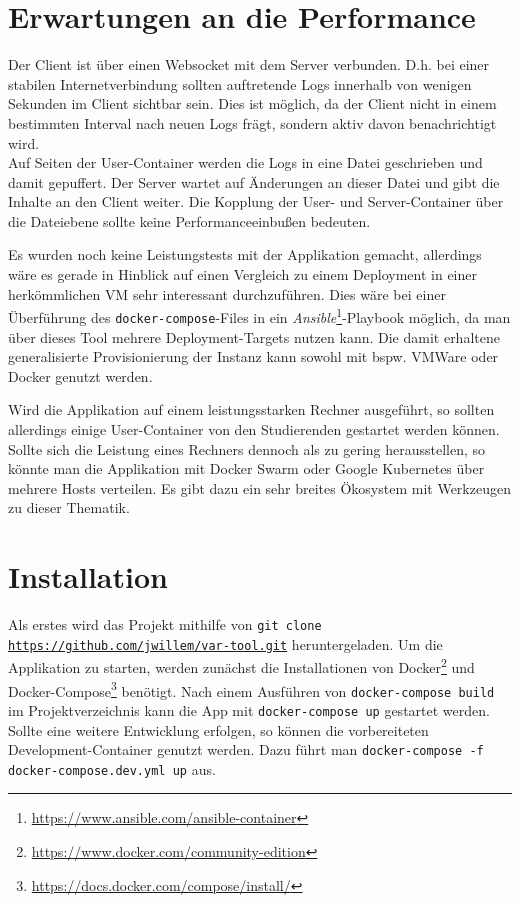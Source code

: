 \section{Erwartungen an die Performance}
Der Client ist über einen Websocket mit dem Server verbunden.
D.h. bei einer stabilen Internetverbindung sollten auftretende Logs innerhalb von wenigen Sekunden im Client sichtbar sein.
Dies ist möglich, da der Client nicht in einem bestimmten Interval nach neuen Logs frägt, sondern aktiv davon benachrichtigt wird.
\\
Auf Seiten der User-Container werden die Logs in eine Datei geschrieben und damit gepuffert.
Der Server wartet auf Änderungen an dieser Datei und gibt die Inhalte an den Client weiter.
Die Kopplung der User- und Server-Container über die Dateiebene sollte keine Performanceeinbußen bedeuten.
\par
Es wurden noch keine Leistungstests mit der Applikation gemacht, allerdings wäre es gerade in Hinblick auf einen Vergleich zu einem Deployment in einer herkömmlichen \ac{VM} sehr interessant durchzuführen.
Dies wäre bei einer Überführung des \texttt{docker-compose}-Files in ein \textit{Ansible}\footnote{\url{https://www.ansible.com/ansible-container}}-Playbook möglich, da man über dieses Tool mehrere Deployment-Targets nutzen kann.
Die damit erhaltene generalisierte Provisionierung der Instanz kann sowohl mit bspw. VMWare oder Docker genutzt werden.
\par
Wird die Applikation auf einem leistungsstarken Rechner ausgeführt, so sollten allerdings einige User-Container von den Studierenden gestartet werden können.
Sollte sich die Leistung eines Rechners dennoch als zu gering herausstellen, so könnte man die Applikation mit Docker Swarm oder Google Kubernetes über mehrere Hosts verteilen.
Es gibt dazu ein sehr breites Ökosystem mit Werkzeugen zu dieser Thematik.
\section{Installation}
Als erstes wird das Projekt mithilfe von \texttt{git clone \url{https://github.com/jwillem/var-tool.git}} heruntergeladen.
Um die Applikation zu starten, werden zunächst die Installationen von Docker\footnote{\url{https://www.docker.com/community-edition}} und Docker-Compose\footnote{\url{https://docs.docker.com/compose/install/}} benötigt.
Nach einem Ausführen von \texttt{docker-compose build} im Projektverzeichnis kann die App mit \texttt{docker-compose up} gestartet werden.
\\
Sollte eine weitere Entwicklung erfolgen, so können die vorbereiteten Development-Container genutzt werden.
Dazu führt man \texttt{docker-compose -f docker-compose\break .dev.yml up} aus.
